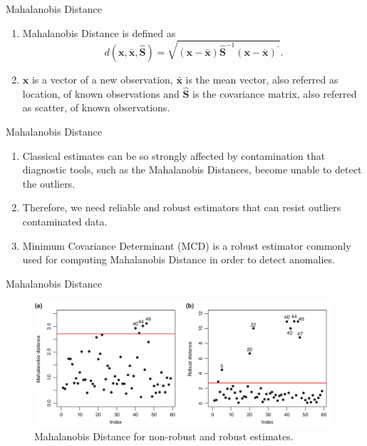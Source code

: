 \documentclass[newPxFont, numfooter, sectionpages]{beamer}
\begin{document}
\begin{frame}[c]{Mahalanobis Distance}
	\begin{enumerate}
		\item Mahalanobis Distance is defined as		
		\begin{equation}\label{eq:eq01}
			d(\boldsymbol{x},\bar{\boldsymbol{x}}, \boldsymbol{\hat{S}}) = \sqrt{(\boldsymbol{x} - \bar{\boldsymbol{x}}) \boldsymbol{\hat{S}}^{-1}(\boldsymbol{x} - \bar{\boldsymbol{x}})^\prime}.
		\end{equation}
		\item $\boldsymbol{x}$ is a vector of a new observation, $\bar{\boldsymbol{x}}$ is the mean vector, also referred as location, of known observations and $\boldsymbol{\hat{S}}$ is the covariance matrix, also referred as scatter, of known observations.
	\end{enumerate}	
\end{frame}

\begin{frame}[c]{Mahalanobis Distance}
	\begin{enumerate}
		\item Classical estimates can be so strongly affected by contamination that diagnostic tools, such as the Mahalanobis Distances, become unable to detect the outliers.
		\item Therefore, we need reliable and robust estimators that can resist outliers contaminated data.
		\item Minimum Covariance Determinant (MCD) \cite{rousseeuw1984least} is a robust estimator commonly used for computing Mahalanobis Distance in order to detect anomalies.
	\end{enumerate}	
\end{frame}

\begin{frame}[c]{Mahalanobis Distance}
	\begin{figure}[h!]
	     \centering
	     \includegraphics[width=11cm]{figures/mahalanobis_robust.png}
	     \caption{Mahalanobis Distance for non-robust and robust estimates.}
	     \label{fig:fig04}
	\end{figure}
\end{frame}
\end{document}
